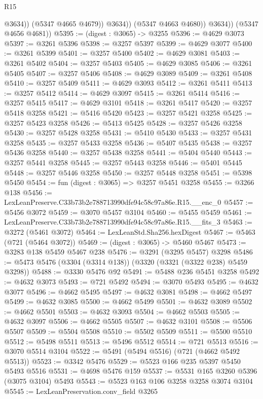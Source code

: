 \begin{lexlean}{R15}
\begin{coremodule}
                      @3634))
                  (@5347 @4665 @4679))
                @3634))
            (@5347 @4663 @4680))
          @3634))
      (@5347 @4656 @4681))
@5395 := (digest : @3065) -> @3255
@5396 := @4629 @3073
@5397 := @3261 @5396
@5398 := @3257 @5397
@5399 := @4629 @3077
@5400 := @3261 @5399
@5401 := @3257 @5400
@5402 := @4629 @3081
@5403 := @3261 @5402
@5404 := @3257 @5403
@5405 := @4629 @3085
@5406 := @3261 @5405
@5407 := @3257 @5406
@5408 := @4629 @3089
@5409 := @3261 @5408
@5410 := @3257 @5409
@5411 := @4629 @3093
@5412 := @3261 @5411
@5413 := @3257 @5412
@5414 := @4629 @3097
@5415 := @3261 @5414
@5416 := @3257 @5415
@5417 := @4629 @3101
@5418 := @3261 @5417
@5420 := @3257 @5418 @3258
@5421 := @5416 @5420
@5423 := @3257 @5421 @3258
@5425 := @3257 @5423 @3258
@5426 := @5413 @5425
@5428 := @3257 @5426 @3258
@5430 := @3257 @5428 @3258
@5431 := @5410 @5430
@5433 := @3257 @5431 @3258
@5435 := @3257 @5433 @3258
@5436 := @5407 @5435
@5438 := @3257 @5436 @3258
@5440 := @3257 @5438 @3258
@5441 := @5404 @5440
@5443 := @3257 @5441 @3258
@5445 := @3257 @5443 @3258
@5446 := @5401 @5445
@5448 := @3257 @5446 @3258
@5450 := @3257 @5448 @3258
@5451 := @5398 @5450
@5454 := fun (digest : @3065) => @3257 @5451 @3258
@5455 := @3266 @138
@5456 := LexLeanPreserve.C33b73b2e788713990dfe94c58c97a86e.R15.__enc_0
@5457 := @5456 @3072
@5459 := @3070 @5457 @3104
@5460 := @5455 @5459
@5461 := LexLeanPreserve.C33b73b2e788713990dfe94c58c97a86e.R15.__fits_3
@5463 := @3272 (@5461 @3072)
@5464 := LexLeanStd.Sha256.hexDigest
@5467 := @5463 (@721 (@5464 @3072))
@5469 := (digest : @3065) -> @5460 @5467
@5473 := @3283 @138 @5459 @5467 @238
@5476 := @3291 (@3295 @5457) @3298
@5486 := @5473 @5476 (@3304 (@3314 @138)) (@3320 (@3321 (@3322 @238) @5459 @3298))
@5488 := @3330 @5476 @92
@5491 := @5488 @236 @5451 @3258
@5492 := @4632 @3073
@5493 := @721 @5492
@5494 := @3070 @5493
@5495 := @4632 @3077
@5496 := @4662 @5495
@5497 := @4632 @3081
@5498 := @4662 @5497
@5499 := @4632 @3085
@5500 := @4662 @5499
@5501 := @4632 @3089
@5502 := @4662 @5501
@5503 := @4632 @3093
@5504 := @4662 @5503
@5505 := @4632 @3097
@5506 := @4662 @5505
@5507 := @4632 @3101
@5508 := @5506 @5507
@5509 := @5504 @5508
@5510 := @5502 @5509
@5511 := @5500 @5510
@5512 := @5498 @5511
@5513 := @5496 @5512
@5514 := @721 @5513
@5516 := @3070 @5514 @3104
@5522 := @5491 (@5494 @5516) (@721 (@4662 @5492 @5513))
@5523 := @3342 @5476
@5529 := @5523 @166 @235 @5397 @5450 @5493 @5516
@5531 := @4698 @5476 @159
@5537 := @5531 @165 @3260 @5396 (@3075 @3104) @5493
@5543 := @5523 @163 @106 @3258 @3258 @3074 @3104
@5545 := LexLeanPreservation.conv_field @3265

\end{coremodule}
\end{lexlean}
